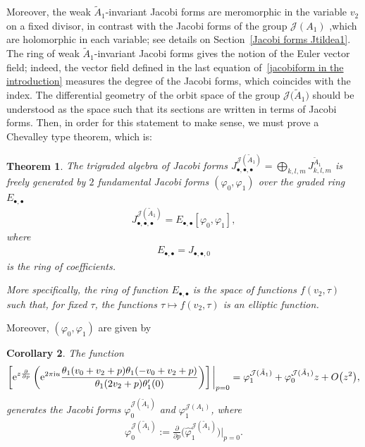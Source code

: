 \documentclass[pdftex]{sigma}%
\numberwithin{equation}{section}
\newtheorem{Theorem}{Theorem}[section]
\newtheorem{Corollary}[Theorem]{Corollary}
\newcommand{\Ja}{\mathcal{J}}
\begin{document}
Moreover, the weak $\tilde A_1$-invariant Jacobi forms are meromorphic in the variable $v_{2}$ on a fixed divisor, in contrast with the Jacobi forms of the group $\Ja(A_1)$ ,which are holomorphic in each variable; see details on Section~\ref{Jacobi forms Jtildea1}. The ring of weak $\tilde A_1$-invariant Jacobi forms gives the notion of the Euler vector field; indeed, the vector field defined in the last equation of~\eqref{jacobiform in the introduction} measures the degree of the Jacobi forms, which coincides with the index. The differential geometry of the orbit space of the group $\Ja\big(\tilde A_1\big)$ should be understood as the space such that its sections are written in terms of Jacobi forms. Then, in order for this statement to make sense, we must prove a Chevalley type theorem, which is:

\begin{Theorem}%
The trigraded algebra of Jacobi forms $J_{\bullet,\bullet,\bullet}^{\Ja(\tilde A_{1})}=\bigoplus _{k,l,m}J_{k,l,m}^{\tilde A_{1}}$ is freely generated by $2$ fundamental Jacobi forms $(\varphi_0,\varphi_1)$ over the graded ring $E_{\bullet,\bullet}$
\begin{gather*}
J_{\bullet,\bullet,\bullet}^{\Ja(\tilde A_1)}=E_{\bullet,\bullet}\left[\varphi_0,\varphi_1\right],
\end{gather*}
where
\begin{gather*}
E_{\bullet,\bullet}=J_{\bullet,\bullet,0}
\end{gather*}
is the ring of coefficients.

More specifically, the ring of function $E_{\bullet,\bullet}$ is the space of functions $f(v_{2},\tau)$ such that, for fixed $\tau$, the functions $\tau\mapsto f(v_{2},\tau)$ is an elliptic function.
\end{Theorem}
Moreover, $(\varphi_0,\varphi_1)$ are given by

\begin{Corollary}
The function
\begin{gather*}
\left[{\rm e}^{z\frac{\partial}{\partial p}} \left({\rm e}^{2\pi {\rm i}u} \frac{\theta_1(v_0+v_2+p)\theta_1(-v_0+v_2+p)}{\theta_1(2v_2+p)\theta_1^{\prime}(0)}\right) \right]
\bigg|_{p=0}=\varphi_1^{\Ja(\tilde A_1)}+\varphi_0^{\Ja(\tilde A_1)}z+O\big(z^2\big),
\end{gather*}
generates the Jacobi forms $\varphi_0^{\Ja(\tilde A_1)}$ and $\varphi_1^{\Ja(A_1)}$,
where
\begin{gather*}
\varphi_0^{\Ja(\tilde A_1)}:=\frac{\partial }{\partial p}\big(\hat\varphi_1^{\Ja(\tilde A_1)} \big)\bigg|_{p=0}.
\end{gather*}
\end{Corollary}
\end{document}
